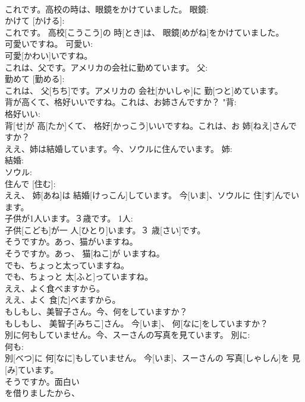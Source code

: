\documentclass[8pt]{extreport}
\begin{document}
\begin{CJK}{UTF8}{min}
\\	これです。高校の時は、眼鏡をかけていました。	眼鏡: 
\\	かけて [かける]: 
\\	これです。 高校[こうこう]の 時[とき]は、 眼鏡[めがね]をかけていました。		
\\	可愛いですね。	可愛い: 
\\	可愛[かわい]いですね。		
\\	これは、父です。アメリカの会社に勤めています。	父: 
\\	勤めて [勤める]: 
\\	これは、 父[ちち]です。アメリカの 会社[かいしゃ]に 勤[つと]めています。		
\\	背が高くて、格好いいですね。これは、お姉さんですか？	"背: 
\\	格好いい: 
\\	背[せ]が 高[たか]くて、 格好[かっこう]いいですね。これは、お 姉[ねえ]さんですか？		
\\	ええ、姉は結婚しています。今、ソウルに住んでいます。	姉: 
\\	結婚: 
\\	ソウル: 
\\	住んで [住む]: 
\\	ええ、 姉[あね]は 結婚[けっこん]しています。 今[いま]、ソウルに 住[す]んでいます。		
\\	子供が1人います。３歳です。	1人: 
\\	子供[こども]が一 人[ひとり]います。３ 歳[さい]です。	
\\	そうですか。あっ、猫がいますね。	
\\	そうですか。あっ、 猫[ねこ]が いますね。	
\\	でも、ちょっと太っていますね。	
\\	でも、ちょっと 太[ふと]っていますね。	
\\	ええ、よく食べますから。	
\\	ええ、よく 食[た]べますから。	
\\	もしもし、美智子さん。今、何をしていますか？	
\\	もしもし、 美智子[みちこ]さん。 今[いま]、 何[なに]をしていますか？	
\\	別に何もしていません。今、スーさんの写真を見ています。	別に: 
\\	何も: 
\\	別[べつ]に 何[なに]もしていません。 今[いま]、スーさんの 写真[しゃしん]を 見[み]ています。	
\\	そうですか。面白い
\\	を借りましたから、	

\end{CJK}
\end{document}
